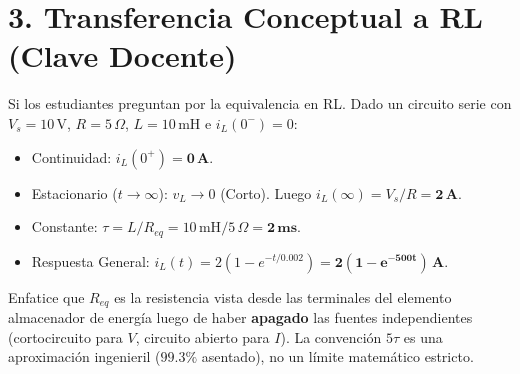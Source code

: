 \documentclass[11pt, a4paper]{article}
\begin{document}
\section*{3. Transferencia Conceptual a RL (Clave Docente)}
Si los estudiantes preguntan por la equivalencia en RL. Dado un circuito serie con $V_s = 10\,\text{V}$, $R = 5\,\Omega$, $L = 10\,\text{mH}$ e $i_L(0^-)=0$:
\begin{itemize}
    \item Continuidad: $i_L(0^+) = \mathbf{0\,\text{A}}$.
    \item Estacionario ($t \to \infty$): $v_L \to 0$ (Corto). Luego $i_L(\infty) = V_s/R = \mathbf{2\,\text{A}}$.
    \item Constante: $\tau = L/R_{eq} = 10\,\text{mH} / 5\,\Omega = \mathbf{2\,\text{ms}}$.
    \item Respuesta General: $i_L(t) = 2(1 - e^{-t / 0.002}) = \mathbf{2(1 - e^{-500t})\,\text{A}}$.
\end{itemize}

\vspace{0.4cm}
\begin{tcolorbox}[colback=red!5!white, colframe=red!70!black, title=\textbf{Precauciones Didácticas para el Instructor}]
Enfatice que $R_{eq}$ es la resistencia vista desde las terminales del elemento almacenador de energía luego de haber \textbf{apagado} las fuentes independientes (cortocircuito para $V$, circuito abierto para $I$). La convención $5\tau$ es una aproximación ingenieril ($99.3\%$ asentado), no un límite matemático estricto.
\end{tcolorbox}
\end{document}
